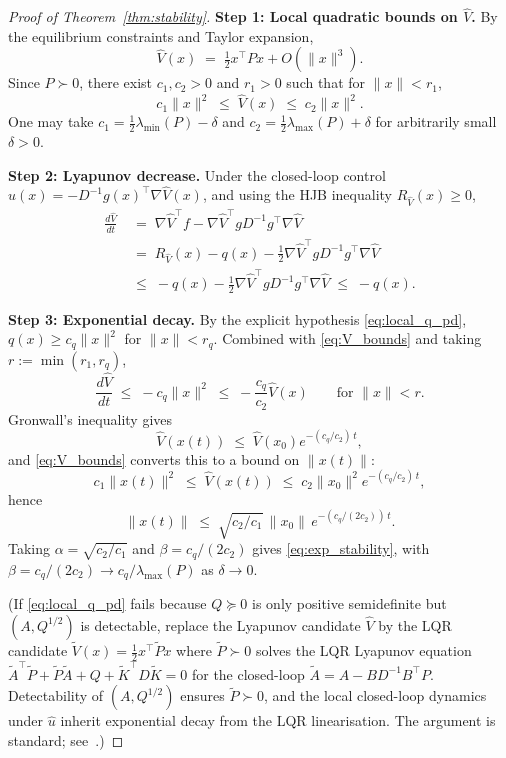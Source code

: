 \documentclass[11pt]{article}
\begin{document}
\begin{proof}[Proof of Theorem~\ref{thm:stability}]
\textbf{Step 1: Local quadratic bounds on $\hat{V}$.}
By the equilibrium constraints and Taylor expansion,
\[
\hat{V}(x) \;=\; \tfrac{1}{2}x^\top P x + O(\|x\|^3).
\]
Since $P \succ 0$, there exist $c_1, c_2 > 0$ and $r_1 > 0$ such that for $\|x\| < r_1$,
\begin{equation}
c_1 \|x\|^2 \;\leq\; \hat{V}(x) \;\leq\; c_2 \|x\|^2.
\label{eq:V_bounds}
\end{equation}
One may take $c_1 = \tfrac{1}{2}\lambda_{\min}(P) - \delta$ and $c_2 = \tfrac{1}{2}\lambda_{\max}(P) + \delta$ for arbitrarily small $\delta > 0$.

\textbf{Step 2: Lyapunov decrease.}
Under the closed-loop control $\hat{u}(x) = -D^{-1}g(x)^\top \nabla \hat{V}(x)$, and using the HJB inequality $R_{\hat V}(x)\geq 0$,
\begin{align*}
\frac{d\hat{V}}{dt}
&\;=\; \nabla \hat{V}^\top f - \nabla \hat{V}^\top g D^{-1} g^\top \nabla \hat{V} \\
&\;=\; R_{\hat V}(x) - q(x) - \tfrac{1}{2}\nabla \hat{V}^\top g D^{-1} g^\top \nabla \hat{V} \\
&\;\leq\; -q(x) - \tfrac{1}{2}\nabla \hat{V}^\top g D^{-1} g^\top \nabla \hat{V}
\;\leq\; -q(x).
\end{align*}

\textbf{Step 3: Exponential decay.}
By the explicit hypothesis \eqref{eq:local_q_pd}, $q(x) \geq c_q\|x\|^2$ for $\|x\| < r_q$. Combined with \eqref{eq:V_bounds} and taking $r := \min(r_1, r_q)$,
\[
\frac{d\hat{V}}{dt} \;\leq\; -c_q \|x\|^2 \;\leq\; -\frac{c_q}{c_2} \hat{V}(x) \qquad \text{for } \|x\| < r.
\]
Gronwall's inequality gives
\[
\hat{V}(x(t)) \;\leq\; \hat{V}(x_0) e^{-(c_q/c_2)\,t},
\]
and \eqref{eq:V_bounds} converts this to a bound on $\|x(t)\|$:
\[
c_1\|x(t)\|^2 \;\leq\; \hat V(x(t)) \;\leq\; c_2 \|x_0\|^2 e^{-(c_q/c_2)\,t},
\]
hence
\[
\|x(t)\| \;\leq\; \sqrt{c_2/c_1}\,\|x_0\|\,e^{-(c_q/(2c_2))\,t}.
\]
Taking $\alpha=\sqrt{c_2/c_1}$ and $\beta = c_q/(2c_2)$ gives \eqref{eq:exp_stability}, with $\beta = c_q/(2c_2) \to c_q/\lambda_{\max}(P)$ as $\delta\to 0$.

(If \eqref{eq:local_q_pd} fails because $Q\succeq 0$ is only positive semidefinite but $(A,Q^{1/2})$ is detectable, replace the Lyapunov candidate $\hat V$ by the LQR candidate $\tilde V(x) = \tfrac12 x^\top \tilde P x$ where $\tilde P\succ 0$ solves the LQR Lyapunov equation $\tilde A^\top \tilde P + \tilde P \tilde A + Q + \tilde K^\top D \tilde K = 0$ for the closed-loop $\tilde A = A - BD^{-1}B^\top P$. Detectability of $(A,Q^{1/2})$ ensures $\tilde P\succ 0$, and the local closed-loop dynamics under $\hat u$ inherit exponential decay from the LQR linearisation. The argument is standard; see~\cite{anderson_moore}.)
\end{proof}
\end{document}
